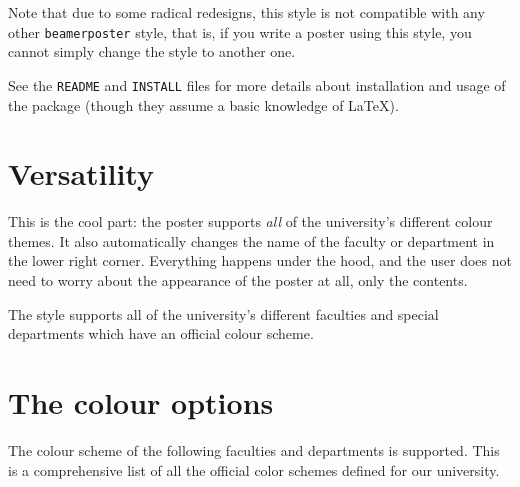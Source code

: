 \documentclass[final]{beamer}
\begin{document}
\begin{poster}
Note that due to some radical redesigns, this style is not compatible with any other \texttt{beamerposter} style, that is, if you write a poster using this style, you cannot simply change the style to another one.

See the \texttt{README} and \texttt{INSTALL} files for more details about installation and usage of the package (though they assume a basic knowledge of \LaTeX).




\newcolumn

\section{Versatility}
This is the cool part: the poster supports \emph{all} of the university's different colour themes. It also automatically changes the name of the faculty or department in the lower right corner. Everything happens under the hood, and the user does not need to worry about the appearance of the poster at all, only the contents.

The style supports all of the university's different faculties and special departments which have an official colour scheme.


\section{The colour options}

The colour scheme of the following faculties and departments is supported. This is a comprehensive list of all the official color schemes defined for our university.


\end{poster}
\end{document}
